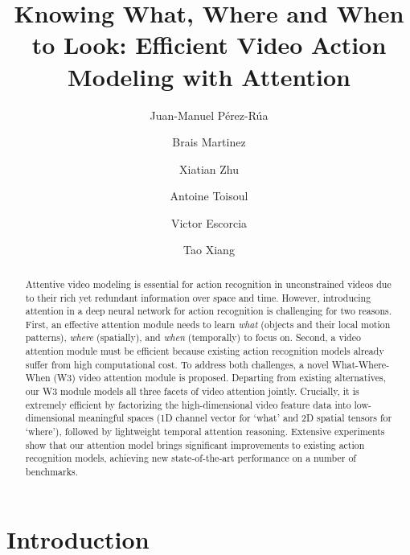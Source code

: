 \documentclass[runningheads]{llncs}
\begin{document}
\pagestyle{headings}
\mainmatter
\def\ECCVSubNumber{1052}  

\title{Knowing What, Where and When to Look: Efficient Video Action Modeling with Attention}

\author{Juan-Manuel P\'erez-R\'ua \and
Brais Martinez \and Xiatian Zhu \and \newline
Antoine Toisoul \and Victor Escorcia \and Tao Xiang
}



\maketitle

\begin{abstract}
Attentive video modeling is essential for action recognition in unconstrained videos due to their rich yet redundant information over space and time.  
However, introducing attention in a deep neural network for action recognition is challenging for two reasons. 
First, an effective attention module needs to learn {\em what} (objects and their local motion patterns),
{\em where} (spatially), and {\em when} (temporally) to focus on. 
Second, a video attention module must be efficient because existing action recognition models already suffer from high computational cost. 
To address both challenges, a novel What-Where-When (W3) video attention module is proposed. 
Departing from existing alternatives, our W3 module models all three facets of video attention jointly. 
Crucially, it is extremely efficient by
factorizing the high-dimensional video feature data into low-dimensional meaningful spaces 
(1D channel vector for `what' and 2D spatial tensors for `where'), 
followed by lightweight temporal attention reasoning. 
Extensive experiments show that our attention model brings significant improvements to existing action recognition models, 
achieving new state-of-the-art performance on a number of benchmarks.





\end{abstract}


\section{Introduction}
\end{document}
